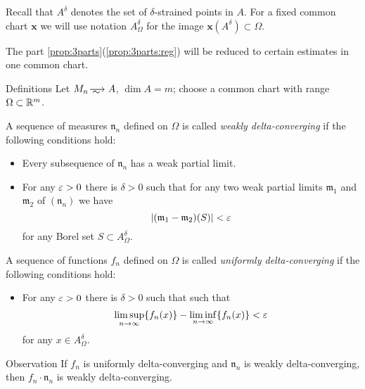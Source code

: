 Recall that $A^\delta$ denotes the set of $\delta$-strained points in $A$.
For a fixed common chart $\bm{x}$ we will use notation $A^\delta_\Omega$ for the image $\bm{x}(A^\delta)\subset \Omega$.

The part \ref{prop:3parts}(\ref{prop:3parts:reg}) will be reduced to certain estimates in one common chart.

\begin{thm}{Definitions}\label{def:delta-converge}
Let $M_n\smooths{} A$, $\dim A=m$;
choose a common chart with range $\Omega\subset \mathbb{R}^m$.

A sequence of measures $\mathfrak n_n$ defined on $\Omega$ is called \emph{weakly delta-converging}
if the following conditions hold:
\begin{itemize}
 \item Every subsequence of $\mathfrak n_n$ has a weak partial limit.
 \item For any $\varepsilon>0$ there is $\delta>0$ such that for any two weak partial limits $\mathfrak m_1$ and $\mathfrak m_2$ of $(\mathfrak n_n)$ we have  
\[|(\mathfrak m_1-\mathfrak m_2)(S)|<\varepsilon\]
for any Borel set $S\subset A^\delta_\Omega$.
\end{itemize}

A sequence of functions $f_n$ defined on $\Omega$ is called \emph{uniformly delta-converging}
if the following conditions hold:
\begin{itemize}
 \item For any $\varepsilon>0$ there is $\delta>0$ such that such that 
\[\limsup_{n\to\infty} \{f_n(x)\}-\liminf_{n\to\infty}\{f_n(x)\}<  \varepsilon\]
for any $x\in A^\delta_\Omega$.
\end{itemize}

\end{thm}

\begin{thm}{Observation}\label{obs:delta-weak-uniform}
If $f_n$ is uniformly delta-converging and $\mathfrak n_n$ is weakly delta-converging,
then $f_n\cdot \mathfrak n_n$ is weakly delta-converging.
\end{thm}






